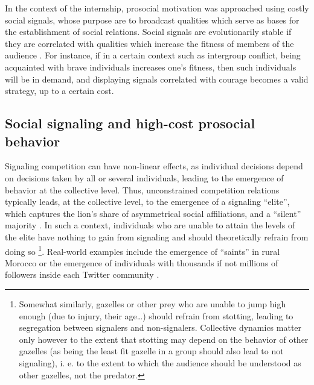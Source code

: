 \documentclass[a4paper,12pt]{report}
\begin{document}
In the context of the internship, prosocial motivation was approached 
using costly social signals, whose purpose are to broadcast qualities which 
serve as bases for the establishment of social relations. 
Social signals are evolutionarily stable if they are correlated with qualities 
which increase the fitness of members of the audience \cite{dessalles_optimal_2014}.
For instance, if in a certain context such as intergroup conflict, being acquainted 
with brave individuals increases one’s fitness, then such individuals will be in demand,
and displaying signals correlated with courage becomes a valid strategy, up to a certain
cost.

\subsection{Social signaling and high-cost prosocial behavior}
\label{s:heroism}
Signaling competition can have non-linear effects, as individual decisions depend on 
decisions taken by all or several individuals, leading to the emergence of behavior
at the collective level. Thus, unconstrained competition relations typically leads,
at the collective level, to the emergence of a signaling “elite”, which captures the
lion’s share of asymmetrical social affiliations, and a “silent” majority \cite{dessalles_optimal_2014}.
In such a context, individuals who are unable to attain the levels of the elite have
nothing to gain from signaling and should theoretically refrain from doing so
\footnote{Somewhat similarly, gazelles or other prey who are unable to jump high enough
(due to injury, their age…) should refrain from stotting, leading to segregation between
signalers and non-signalers. Collective dynamics matter only however to the extent that
stotting may depend on the behavior of other gazelles (as being the least fit gazelle
in a group should also lead to not signaling), i. e. to 
the extent to which the audience should be understood as other gazelles, not the predator.}.
Real-world examples include the emergence of “saints” in rural Morocco \cite{gellner_saints_2001}
or the emergence of individuals with thousands if not millions of followers inside each
Twitter community \cite{kwak_what_2010}.

\end{document}
